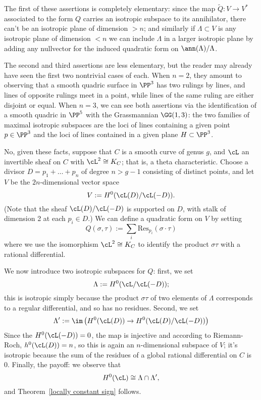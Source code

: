 The first of these assertions is completely elementary: since the map $\tilde Q : V \to V^*$ associated to the form $Q$ carries an isotropic subspace to its annihilator, there can't be an isotropic plane of dimension $>n$; and similarly if $\Lambda \subset V$ is any isotropic plane of dimension $<n$ we can include $\Lambda$ in a larger isotropic plane by adding any nullvector for the induced quadratic form on $\ann(\Lambda)/\Lambda$.

The second and third assertions are less elementary, but the reader may already have seen the first two nontrivial cases of each. When $n=2$, they amount to observing that a smooth quadric surface in $\PP^3$ has two rulings by lines, and lines of opposite rulings meet in a point, while lines of the same ruling are either disjoint or equal. When $n=3$, we can see both assertions via the identification of a smooth quadric in $\PP^5$ with the Grassmannian $\GG(1,3)$: the two families of maximal isotropic subspaces are the loci of lines containing a given point $p \in \PP^3$ and the loci of lines contained in a given plane $H \subset \PP^3$.

No, given these facts, suppose that $C$ is a smooth curve of genus $g$, and $\cL$ an invertible sheaf on $C$ with $\cL^2 \cong K_C$; that is, a theta characteristic. Choose a divisor $D = p_1 + \dots + p_n$ of degree $n> g-1$ consisting of distinct points, and let $V$ be the $2n$-dimensional vector space
$$
V := H^0( \cL(D) / \cL(-D) ).
$$
(Note that the sheaf $ \cL(D) / \cL(-D) $ is supported on $D$, with stalk of dimension 2 at each $p_i \in D$.) We can define a quadratic form on $V$ by setting
$$
Q(\sigma, \tau) := \sum_i \text{Res}_{p_i}(\sigma \cdot \tau)
$$
where we use the isomorphism $\cL^2 \cong K_C$ to identify the product $\sigma\tau$ with a rational differential.

We now introduce two isotropic subspaces for $Q$: first, we set
$$
\Lambda := H^0( \cL / \cL(-D) );
$$
this is isotropic simply because the product $\sigma\tau$ of two elements of $\Lambda$ corresponds to a regular differential, and so has no residues. Second, we set
$$
\Lambda' := \im\left( H^0(\cL(D)) \to H^0( \cL(D) / \cL(-D) ) \right)
$$
Since the $H^0(\cL(-D)) = 0$, the map is injective and according to Riemann-Roch, $h^0(\cL(D)) = n$, so this is again an $n$-dimensional subspace of $V$; it's isotropic because the sum of the residues of a global rational differential on $C$ is 0. Finally, the payoff: we observe that
$$
H^0(\cL) \cong \Lambda \cap \Lambda',
$$
and Theorem~\ref{locally constant sign} follows.

